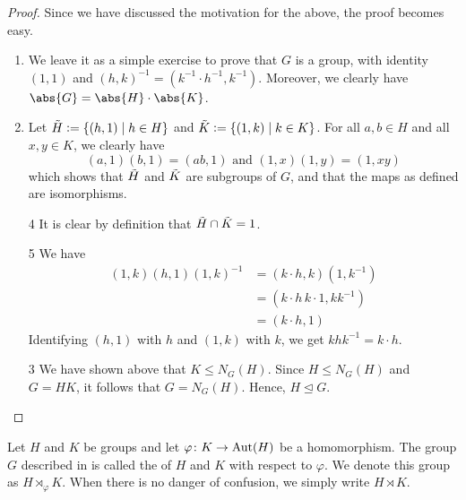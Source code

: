 \begin{proof}
    Since we have discussed the motivation for the above, the proof becomes easy.
    \begin{enumerate}
        \item We leave it as a simple exercise to prove that $G$ is a group, with identity $(1,1)$ and $(h,k)^{-1} = (k^{-1} \cdot h^{-1}, k^{-1})$. Moreover, we clearly have $\abs{G} = \abs{H} \cdot \abs{K}$.
        \item Let $\Tilde{H} \vcentcolon= \{(h,1) \mid h \in H\}$ and $\Tilde{K} \vcentcolon= \{(1,k) \mid k\in K\}$. For all $a,b \in H$ and all $x,y \in K$, we clearly have
        \[
            (a,1)(b,1) = (ab,1) \text{ and } (1,x)(1,y) = (1,xy)
        \]
        which shows that $\Tilde{H}$ and $\Tilde{K}$ are subgroups of $G$, and that the maps as defined are isomorphisms. 
        \item[4] It is clear by definition that $\Tilde{H} \cap \Tilde{K} = 1$.
        \item[5] We have
        \begin{align*}
            (1,k)(h,1)(1,k)^{-1} &= (k\cdot h, k)(1,k^{-1}) \\
            &= (k\cdot h \, k\cdot 1, kk^{-1}) \\
            &= (k \cdot h, 1)
        \end{align*}
        Identifying $(h,1)$ with $h$ and $(1,k)$ with $k$, we get $khk^{-1} = k \cdot h$.
        \item[3] We have shown above that $K \leq N_G(H)$. Since $H \leq N_G(H)$ and $G = HK$, it follows that $G = N_G(H)$. Hence, $H \trianglelefteq G$.
    \end{enumerate}
\end{proof}

\begin{defn}
    Let $H$ and $K$ be groups and let $\varphi \colon K \to \operatorname{Aut}(H)$ be a homomorphism. The group $G$ described in  is called the  of $H$ and $K$ with respect to $\varphi$. We denote this group as $H \rtimes_{\varphi} K$. When there is no danger of confusion, we simply write $H \rtimes K$.
\end{defn}

